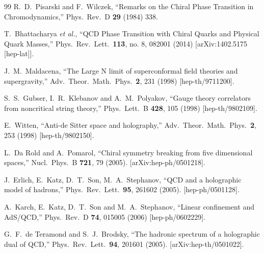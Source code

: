 \documentclass[11pt,a4paper,psfrag]{article}
\begin{document}
\begin{thebibliography}{99}
  R.~D.~Pisarski and F.~Wilczek,
  ``Remarks on the Chiral Phase Transition in Chromodynamics,''
  Phys.\ Rev.\ D {\bf 29} (1984) 338.

  T.~Bhattacharya {\it et al.},
  ``QCD Phase Transition with Chiral Quarks and Physical Quark Masses,''
  Phys.\ Rev.\ Lett.\  {\bf 113}, no. 8, 082001 (2014)
  [arXiv:1402.5175 [hep-lat]].



  J.~M.~Maldacena,
  ``The Large N limit of superconformal field theories and supergravity,''
  Adv.\ Theor.\ Math.\ Phys.\  {\bf 2}, 231 (1998)
  [hep-th/9711200].

  S.~S.~Gubser, I.~R.~Klebanov and A.~M.~Polyakov,
  ``Gauge theory correlators from noncritical string theory,''
  Phys.\ Lett.\ B {\bf 428}, 105 (1998)
  [hep-th/9802109].

  E.~Witten,
  ``Anti-de Sitter space and holography,''
  Adv.\ Theor.\ Math.\ Phys.\  {\bf 2}, 253 (1998)
  [hep-th/9802150].


L.~Da Rold and A.~Pomarol,
``Chiral symmetry breaking from five dimensional spaces,''
Nucl.\ Phys.\ B \textbf{721}, 79 (2005).  [arXiv:hep-ph/0501218].

J.~Erlich, E.~Katz, D.~T.~Son, M.~A.~Stephanov,
 ``QCD and a holographic model of hadrons,''
  Phys.\ Rev.\ Lett.\  {\bf 95}, 261602 (2005).
  [hep-ph/0501128].

  A.~Karch, E.~Katz, D.~T.~Son and M.~A.~Stephanov,
  ``Linear confinement and AdS/QCD,''
  Phys.\ Rev.\ D {\bf 74}, 015005 (2006)  [hep-ph/0602229].  %

G.~F.~de Teramond and S.~J.~Brodsky,
``The hadronic spectrum of a holographic dual of QCD,''
Phys.\ Rev.\ Lett.\ \textbf{94}, 201601 (2005).  [arXiv:hep-th/0501022].



\end{thebibliography}
\end{document}

